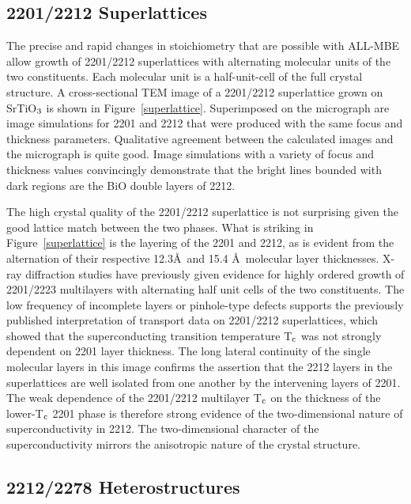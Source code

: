 \subsection{2201/2212 Superlattices}

The precise and rapid changes in stoichiometry that are possible with
ALL-MBE allow growth of 2201/2212 superlattices with alternating
molecular units of the two constituents.  Each molecular unit is a
half-unit-cell of the full crystal structure.  A cross-sectional TEM
image of a 2201/2212 superlattice grown on SrTiO$\rm _3$ is shown in
Figure~\ref{superlattice}.  Superimposed on the micrograph are image
simulations for 2201 and 2212 that were produced with the same focus
and thickness parameters.  Qualitative agreement between the
calculated images and the micrograph is quite good.  Image simulations
with a variety of focus and thickness values convincingly demonstrate
that the bright lines bounded with dark regions are the BiO double
layers of 2212.

The high crystal quality of the 2201/2212 superlattice is not
surprising given the good lattice match between the two phases.  What
is striking in Figure~\ref{superlattice} is the layering of the 2201
and 2212, as is evident from the alternation of their respective
12.3\AA\ and 15.4 \AA\ molecular layer thicknesses.  X-ray diffraction
studies have previously given evidence for highly ordered growth of
2201/2223 multilayers with alternating half unit cells of the two
constituents.\cite{schlom} The low frequency of incomplete layers or
pinhole-type defects supports the previously published interpretation
of transport data on 2201/2212 superlattices, which showed that the
superconducting transition temperature T$\rm _c$ was not strongly
dependent on 2201 layer thickness.\cite{bozovic} The long lateral
continuity of the single molecular layers in this image confirms the
assertion that the 2212 layers in the superlattices are well isolated
from one another by the intervening layers of 2201.  The weak
dependence of the 2201/2212 multilayer T$\rm _c$ on the thickness of
the lower-T$\rm _c$ 2201 phase is therefore strong evidence of the
two-dimensional nature of superconductivity in 2212.\cite{bozovic} The
two-dimensional character of the superconductivity mirrors the
anisotropic nature of the crystal structure.


\subsection{2212/2278 Heterostructures}

